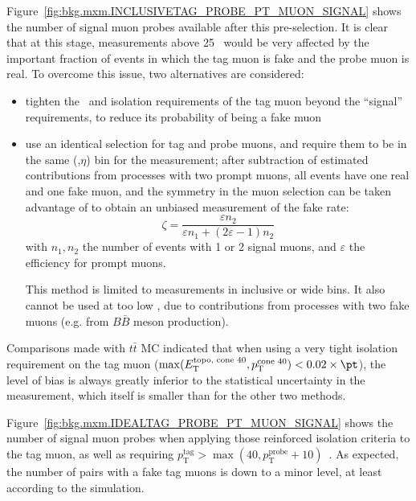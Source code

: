 Figure~\ref{fig:bkg.mxm.INCLUSIVETAG_PROBE_PT_MUON_SIGNAL} shows the number of signal muon probes available after this pre-selection. 
It is clear that at this stage, measurements above 25 \GeV~would be very affected by the important fraction of events 
in which the tag muon is fake and the probe muon is real. 
To overcome this issue, two alternatives are considered: 
\begin{itemize}
\item tighten the \pt\ and isolation requirements of the tag muon beyond the ``signal'' requirements,
to reduce its probability of being a fake muon
\item use an identical selection for tag and probe muons, and require them to be in the same (\pt,$\eta$) bin for the measurement; 
after subtraction of estimated contributions from processes with two prompt muons, all events have one real and one fake muon, 
and the symmetry in the muon selection can be taken advantage of to obtain an unbiased measurement of the fake rate: 
$$
\zeta = \frac{\varepsilon n_2}{\varepsilon n_1+(2\varepsilon-1)n_2}
$$
with $n_1, n_2$ the number of events with 1 or 2 signal muons, 
and $\varepsilon$ the efficiency for prompt muons.

This method is limited to measurements in inclusive or wide bins. 
It also cannot be used at too low \pt, due to contributions from processes with two fake muons (e.g. from $B\bar B$ meson production). 
\end{itemize}
Comparisons made with $t\bar t$ MC indicated that when using a very tight isolation requirement on the tag muon 
($\operatorname{max}(E_\mathrm{T}^\text{topo, cone 40},p_\mathrm{T}^\text{cone 40})<0.02\times\pt$), 
the level of bias is always greatly inferior to the statistical uncertainty in the measurement, 
which itself is smaller than for the other two methods. 

Figure~\ref{fig:bkg.mxm.IDEALTAG_PROBE_PT_MUON_SIGNAL} shows the number of signal muon probes when applying those reinforced isolation criteria to the tag muon, 
as well as requiring $p_\mathrm{T}^\text{tag}>\operatorname{max}(40,p_\mathrm{T}^\text{probe}+10)$~\GeV. 
As expected, the number of pairs with a fake tag muons is down to a minor level, at least according to the simulation. 

